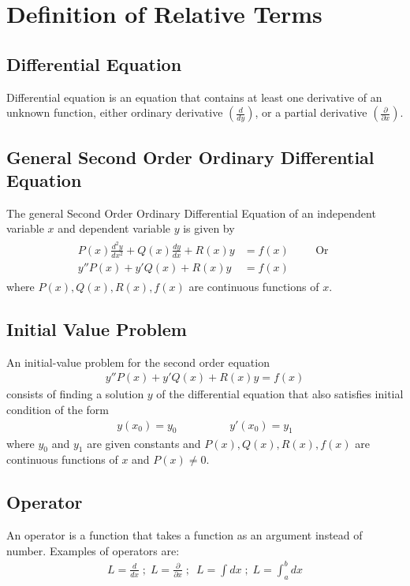 \documentclass[11pt]{report}
\newcommand{\sps}{\\[0.2cm]}
\newcommand{\dsp}{\displaystyle}
\newcommand{\sprime}{'}
\newcommand{\dprime}{''}
\begin{document}
	\section{Definition of Relative Terms}
	\subsection{Differential Equation}
	Differential equation is an equation that contains at least one derivative of an unknown function, either ordinary derivative $\dsp\left(\frac{d}{dy}\right)$, or a partial derivative $\dsp\left(\frac{\partial}{\partial x}\right)$.
	
	\subsection{General Second Order Ordinary Differential Equation}
	The general Second Order Ordinary Differential Equation of an independent variable $x$ and dependent variable $y$ is given by 
	\begin{eqnarray*}
		\begin{split}
			P(x)\frac{d^2y}{dx^2} + Q(x)\frac{dy}{dx} + R(x)y &= f(x) \hspace{1cm} \text{Or }\sps
			y\dprime P(x) + y\sprime Q(x) + R(x)y &= f(x)
		\end{split}
	\end{eqnarray*}
	where $P(x), Q(x), R(x),f(x)$ are continuous functions of $x$.
	
	\subsection{Initial Value Problem}
	An initial-value problem for the second order equation
	\begin{eqnarray*}
		y\dprime P(x) + y\sprime Q(x) + R(x)y = f(x)
	\end{eqnarray*}
	consists of finding a solution $y$ of the differential equation that also satisfies initial condition of the form
	\begin{eqnarray*}
		y(x_0) = y_0 \hspace{2cm} y\sprime(x_0) = y_1
	\end{eqnarray*}
	where $y_0$ and $y_1$ are given constants and $P(x), Q(x), R(x),f(x)$ are continuous functions of $x$ and $P(x)\neq 0$.
	
	\subsection{Operator}
	An operator is a function that takes a function as an argument instead of number. Examples of operators are:
	\begin{eqnarray*}
		L = \frac{d}{dx}\; ; \; L=\frac{\partial}{\partial x}\; ; \ \; L = \int dx\; ; \; L= \int_a^b dx
	\end{eqnarray*}
	
\end{document}
